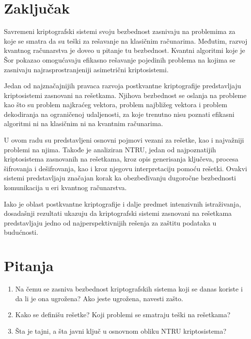 \section{Zaključak}

Savremeni kriptografski sistemi svoju bezbednost zasnivaju na problemima za koje se smatra da su teški za rešavanje na klasičnim računarima. Međutim, razvoj kvantnog računarstva je doveo u pitanje tu bezbednost. Kvantni algoritmi koje je Šor pokazao omogućavaju efikasno rešavanje pojedinih problema na kojima se zasnivaju najrasprostranjeniji asimetrični kriptosistemi.

Jedan od najznačajnijih pravaca razvoja postkvantne kriptografije predstavljaju kriptosistemi zasnovani na rešetkama. Njihova bezbednost se oslanja na probleme kao što su problem najkraćeg vektora, problem najbližeg vektora i problem dekodiranja na ograničenoj udaljenosti, za koje trenutno nisu poznati efikasni algoritmi ni na klasičnim ni na kvantnim računarima.

U ovom radu su predstavljeni osnovni pojmovi vezani za rešetke, kao i najvažniji problemi na njima. Takođe je analiziran NTRU, jedan od najpoznatijih kriptosistema zasnovanih na rešetkama, kroz opis generisanja ključeva, procesa šifrovanja i dešifrovanja, kao i kroz njegovu interpretaciju pomoću rešetki. Ovakvi sistemi predstavljaju značajan korak ka obezbeđivanju dugoročne bezbednosti komunikacija u eri kvantnog računarstva.

Iako je oblast postkvantne kriptografije i dalje predmet intenzivnih istraživanja, dosadašnji rezultati ukazuju da kriptografski sistemi zasnovani na rešetkama predstavljaju jedno od najperspektivnijih rešenja za zaštitu podataka u budućnosti.

\section{Pitanja}
\begin{enumerate}
    \item Na čemu se zasniva bezbednost kriptografskih sistema koji se danas koriste i da li je ona ugrožena? Ako jeste ugrožena, navesti zašto.
    \item Kako se definišu rešetke? Koji problemi se smatraju teški na rešetkama?
    \item Šta je tajni, a šta javni ključ u osnovnom obliku NTRU kriptosistema?

\end{enumerate}